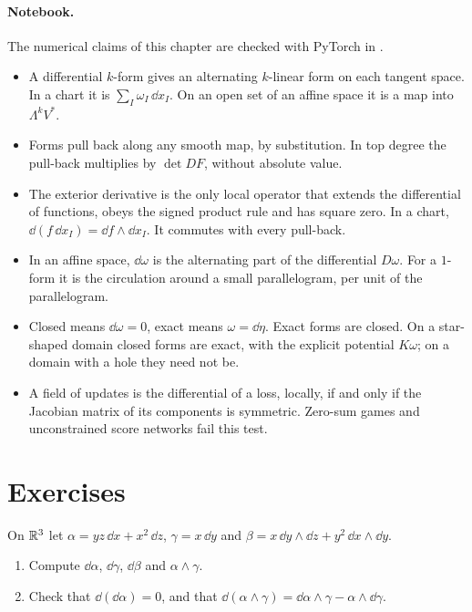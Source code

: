 \begin{notechapter}
\paragraph{Notebook.} The numerical claims of this chapter are checked
with PyTorch in .

\begin{chaptersummary}
\begin{itemize}[nosep]
  \item A differential $k$-form gives an alternating $k$-linear form on
        each tangent space. In a chart it is
        $\sum_I\omega_I\,\dd x_I$. On an open set of an affine space it
        is a map into $\Lambda^kV^*$.
  \item Forms pull back along any smooth map, by substitution. In top
        degree the pull-back multiplies by $\det DF$, without absolute
        value.
  \item The exterior derivative is the only local operator that
        extends the differential of functions, obeys the signed product
        rule and has square zero. In a chart,
        $\dd(f\,\dd x_I) = \dd f\wedge\dd x_I$. It commutes with every
        pull-back.
  \item In an affine space, $\dd\omega$ is the alternating part of the
        differential $D\omega$. For a $1$-form it is the circulation
        around a small parallelogram, per unit of the parallelogram.
  \item Closed means $\dd\omega = 0$, exact means $\omega = \dd\eta$.
        Exact forms are closed. On a star-shaped domain closed forms
        are exact, with the explicit potential $K\omega$; on a domain
        with a hole they need not be.
  \item A field of updates is the differential of a loss, locally, if
        and only if the Jacobian matrix of its components is
        symmetric. Zero-sum games and unconstrained score networks
        fail this test.
\end{itemize}
\end{chaptersummary}

\section*{Exercises}

\begin{exercise}\label{differential-forms:exr:1}
On $\mathbb{R}^3$ let $\alpha = yz\,\dd x + x^2\,\dd z$, $\gamma = x\,\dd y$
and $\beta = x\,\dd y\wedge\dd z + y^2\,\dd x\wedge\dd y$.
\begin{enumerate}[nosep]
  \item Compute $\dd\alpha$, $\dd\gamma$, $\dd\beta$ and
        $\alpha\wedge\gamma$.
  \item Check that $\dd(\dd\alpha) = 0$, and that
        $\dd(\alpha\wedge\gamma)
        = \dd\alpha\wedge\gamma - \alpha\wedge\dd\gamma$.
\end{enumerate}
\end{exercise}


\end{notechapter}
